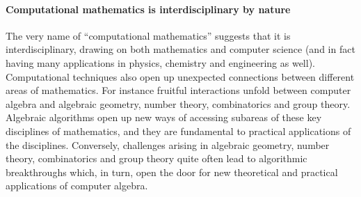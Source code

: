 

\paragraph{Computational mathematics is interdisciplinary by nature}


The very name of ``computational mathematics'' suggests that it is
interdisciplinary, drawing on both mathematics and computer
science (and in fact having many applications in physics, chemistry
and engineering as well). Computational techniques also open up
unexpected connections between different areas of mathematics.
For instance fruitful interactions unfold between computer algebra and
algebraic geometry, number theory, combinatorics and group theory. Algebraic algorithms
open up new ways of accessing subareas of these key disciplines of
mathematics, and they are fundamental to practical applications of the
disciplines. Conversely, challenges arising in algebraic geometry, number
theory, combinatorics and group theory quite often lead to algorithmic breakthroughs
which, in turn, open the door for new theoretical and practical applications
of computer algebra.

